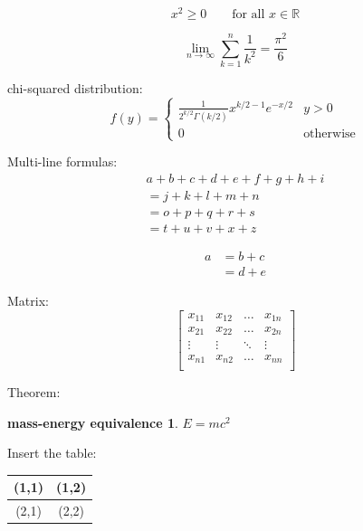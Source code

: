 \documentclass[12pt,hyperref,a4paper,UTF8]{ctexart}
\begin{document}
\begin{equation}\label{eq:3}
    x^2 \geq 0 \qquad \text{for all } x \in \mathbb{R}
\end{equation}

\begin{equation}\label{eq:4}
    \lim_{n \to \infty}
    \sum_{k=1}^n \frac{1}{k^2}
    = \frac{\pi^2}{6}
\end{equation}

chi-squared distribution:
\begin{equation}\label{eq:5}
    f(y) =
    \begin{cases}
        \frac{1}{2^{k/2}\Gamma(k/2)} x^{k/2-1} e^{-x/2} & y>0              \\
        0                                               & \text{otherwise}
    \end{cases}
\end{equation}

Multi-line formulas:
\begin{multline} \label{eq:6}
    a + b + c + d + e + f
    + g + h + i \\
    = j + k + l + m + n\\
    = o + p + q + r + s\\
    = t + u + v + x + z
\end{multline}

\begin{align} \label{eq:7}
    a & = b + c \\
      & = d + e
\end{align}

Matrix:
\begin{equation} \label{eq:8}
    \begin{bmatrix}
        x_{11} & x_{12} & \ldots & x_{1n} \\
        x_{21} & x_{22} & \ldots & x_{2n} \\
        \vdots & \vdots & \ddots & \vdots \\
        x_{n1} & x_{n2} & \ldots & x_{nn} \\
    \end{bmatrix}
\end{equation}

Theorem:
\newtheorem{mass-energy equivalence}{mass-energy equivalence}[section]
\begin{mass-energy equivalence} \label{thm:1}
$E = mc^2$
\end{mass-energy equivalence}

Insert the table:
\begin{table}[h]
    \begin{tabular}{|c|c|}%
        \hline  %
        (1,1) & (1,2) \\
        \hline  %
        (2,1) & (2,2) \\
        \hline %
    \end{tabular}
\end{table}
\end{document}
